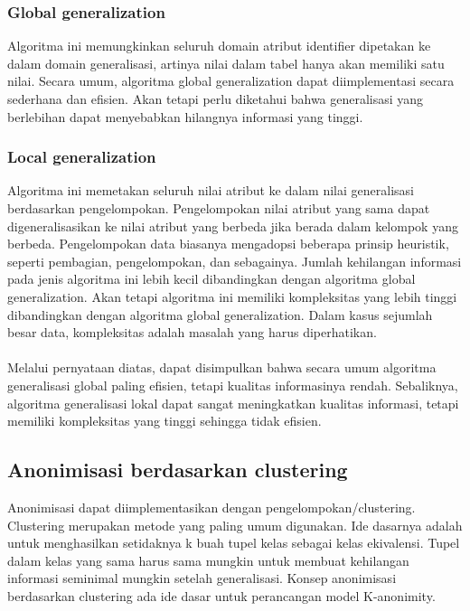 \subsubsection{Global generalization}
Algoritma ini memungkinkan seluruh domain atribut identifier dipetakan ke dalam domain generalisasi, artinya nilai dalam tabel hanya akan memiliki satu nilai. Secara umum, algoritma global generalization dapat diimplementasi secara sederhana dan efisien. Akan tetapi perlu diketahui bahwa generalisasi yang berlebihan dapat menyebabkan hilangnya informasi yang tinggi. 

\subsubsection{Local generalization}
Algoritma ini memetakan seluruh nilai atribut ke dalam nilai generalisasi berdasarkan pengelompokan. Pengelompokan nilai atribut yang sama dapat digeneralisasikan ke nilai atribut yang berbeda jika berada dalam kelompok yang berbeda. Pengelompokan data biasanya mengadopsi beberapa prinsip heuristik, seperti pembagian, pengelompokan, dan sebagainya. Jumlah kehilangan informasi pada jenis algoritma ini lebih kecil dibandingkan dengan algoritma global generalization. Akan tetapi algoritma ini memiliki kompleksitas yang lebih tinggi dibandingkan dengan algoritma global generalization. Dalam kasus sejumlah besar data, kompleksitas adalah masalah yang harus diperhatikan. 
\\\\
Melalui pernyataan diatas, dapat disimpulkan bahwa secara umum algoritma generalisasi global paling efisien, tetapi kualitas informasinya rendah. Sebaliknya, algoritma generalisasi lokal dapat sangat meningkatkan kualitas informasi, tetapi memiliki kompleksitas yang tinggi sehingga tidak efisien. 

\subsection{Anonimisasi berdasarkan clustering}
Anonimisasi dapat diimplementasikan dengan pengelompokan/clustering. Clustering merupakan metode yang paling umum digunakan. Ide dasarnya adalah untuk menghasilkan setidaknya k buah tupel kelas sebagai kelas ekivalensi. Tupel dalam kelas yang sama harus sama mungkin untuk membuat kehilangan informasi seminimal mungkin setelah generalisasi. Konsep anonimisasi berdasarkan clustering ada ide dasar untuk perancangan model K-anonimity.

\newpage
